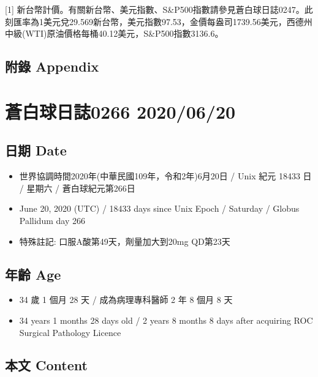 \documentclass[a5paper, 11pt
]{book}
\providecommand{\tightlist}{%
  \setlength{\itemsep}{0pt}\setlength{\parskip}{0pt}}
\begin{document}
{[}1{]}
新台幣計價。有關新台幣、美元指數、S\&P500指數請參見蒼白球日誌0247。此刻匯率為1美元兌29.569新台幣，美元指數97.53，金價每盎司1739.56美元，西德州中級(WTI)原油價格每桶40.12美元，S\&P500指數3136.6。

\hypertarget{ux9644ux9304-appendix-16}{%
\subsection{附錄 Appendix}\label{ux9644ux9304-appendix-16}}

\hypertarget{ux84bcux767dux7403ux65e5ux8a8c0266-20200620}{%
\section{蒼白球日誌0266
2020/06/20}\label{ux84bcux767dux7403ux65e5ux8a8c0266-20200620}}

\hypertarget{ux65e5ux671f-date-17}{%
\subsection{日期 Date}\label{ux65e5ux671f-date-17}}

\begin{itemize}
\tightlist
\item
  世界協調時間2020年(中華民國109年，令和2年)6月20日 / Unix 紀元 18433 日
  / 星期六 / 蒼白球紀元第266日
\item
  June 20, 2020 (UTC) / 18433 days since Unix Epoch / Saturday / Globus
  Pallidum day 266
\item
  特殊註記: 口服A酸第49天，劑量加大到20mg QD第23天
\end{itemize}

\hypertarget{ux5e74ux9f61-age-17}{%
\subsection{年齡 Age}\label{ux5e74ux9f61-age-17}}

\begin{itemize}
\tightlist
\item
  34 歲 1 個月 28 天 / 成為病理專科醫師 2 年 8 個月 8 天
\item
  34 years 1 months 28 days old / 2 years 8 months 8 days after
  acquiring ROC Surgical Pathology Licence
\end{itemize}

\hypertarget{ux672cux6587-content-17}{%
\subsection{本文 Content}\label{ux672cux6587-content-17}}
\end{document}
